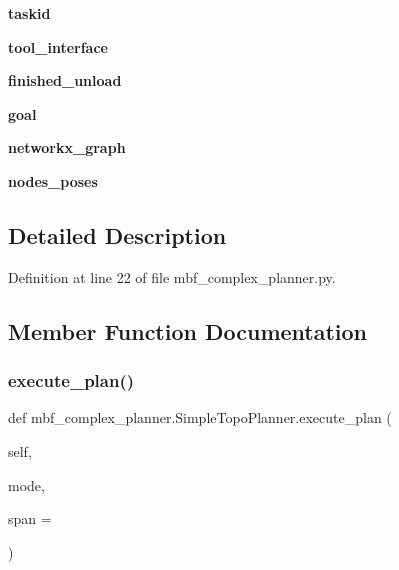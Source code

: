 \begin{DoxyCompactItemize}
{\bfseries taskid}
\item 
\mbox{\label{classmbf__complex__planner_1_1SimpleTopoPlanner_a8762a74b57c99e93d580050cae11ba53}} 
{\bfseries tool\+\_\+interface}
\item 
\mbox{\label{classmbf__complex__planner_1_1SimpleTopoPlanner_afa1cc209cff55529c35b6059b8aa1b1b}} 
{\bfseries finished\+\_\+unload}
\item 
\mbox{\label{classmbf__complex__planner_1_1SimpleTopoPlanner_a5544562c9556489271904fe02daaf42b}} 
{\bfseries goal}
\item 
\mbox{\label{classmbf__complex__planner_1_1SimpleTopoPlanner_ac617dfc0d4fb60e61d363725cb632eea}} 
{\bfseries networkx\+\_\+graph}
\item 
\mbox{\label{classmbf__complex__planner_1_1SimpleTopoPlanner_aa287b90e1ad22db2afdfee23711ccfd9}} 
{\bfseries nodes\+\_\+poses}
\end{DoxyCompactItemize}


\subsection{Detailed Description}


Definition at line 22 of file mbf\+\_\+complex\+\_\+planner.\+py.



\subsection{Member Function Documentation}
\mbox{\label{classmbf__complex__planner_1_1SimpleTopoPlanner_a9eb51a878e3f7891274bad1e253b61f4}} 
\subsubsection{\texorpdfstring{execute\+\_\+plan()}{execute\_plan()}}
{\footnotesize\ttfamily def mbf\+\_\+complex\+\_\+planner.\+Simple\+Topo\+Planner.\+execute\+\_\+plan (\begin{DoxyParamCaption}\item[{}]{self,  }\item[{}]{mode,  }\item[{}]{span = {} }\end{DoxyParamCaption})}

